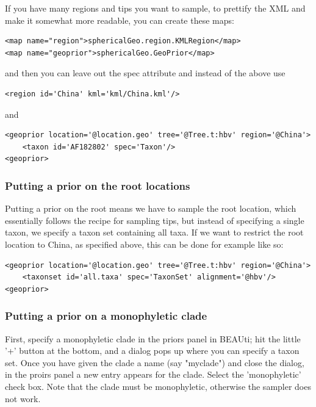 \documentclass{article}
\begin{document}
If you have many regions and tips you want to sample, to prettify the XML and make it somewhat more readable, you can create these maps:

\begin{verbatim}
<map name="region">sphericalGeo.region.KMLRegion</map>
<map name="geoprior">sphericalGeo.GeoPrior</map>
\end{verbatim}

and then you can leave out the spec attribute and instead of the above use

\begin{verbatim}
<region id='China' kml='kml/China.kml'/>
\end{verbatim}

and 

\begin{verbatim}
<geoprior location='@location.geo' tree='@Tree.t:hbv' region='@China'>
	<taxon id='AF182802' spec='Taxon'/>
<geoprior>
\end{verbatim}


\subsubsection*{Putting a prior on the root locations}

Putting a prior on the root means we have to sample the root location, which essentially follows the recipe for sampling tips, but instead of specifying a single taxon, we specify a taxon set containing all taxa. If we want to restrict the root location to China, as specified above, this can be done for example like so:

\begin{verbatim}
<geoprior location='@location.geo' tree='@Tree.t:hbv' region='@China'>
	<taxonset id='all.taxa' spec='TaxonSet' alignment='@hbv'/>
<geoprior>
\end{verbatim}


\subsubsection*{Putting a prior on a monophyletic clade}

First, specify a monophyletic clade in the priors panel in BEAUti; hit the little '+' button at the bottom, and a dialog pops up where you can specify a taxon set. Once you have given the clade a name (say "myclade") and close the dialog, in the proirs panel a new entry appears for the clade. Select the 'monophyletic' check box. Note that the clade must be monophyletic, otherwise the sampler does not work.
\end{document}
